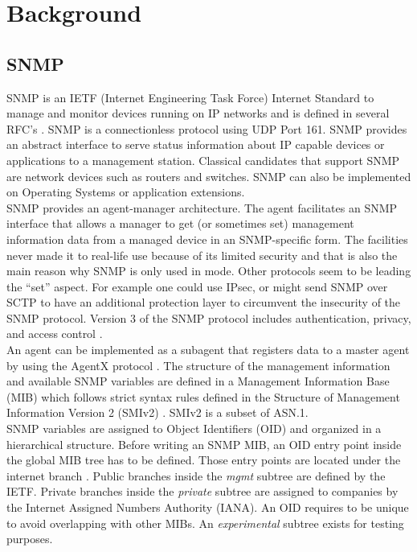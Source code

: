 \section{Background}
\label{chap:background}
\subsection{SNMP}
SNMP is an IETF (Internet Engineering Task Force) Internet Standard to manage and monitor devices running on IP networks and is defined in several RFC's \cite{snmp-rfc}. SNMP is a connectionless protocol using UDP Port 161. SNMP provides an abstract interface to serve status information about IP capable devices or applications to a management station. Classical candidates that support SNMP are network devices such as routers and switches. SNMP can also be implemented on Operating Systems or application extensions. 
\\
SNMP provides an agent-manager architecture. The agent facilitates an SNMP interface that allows a manager to get (or sometimes set) management information data from a managed device in an SNMP-specific form.
The  facilities never made it to real-life use because of its limited security and that is also the main reason why SNMP is only used in  mode. Other protocols seem to be leading the “set” aspect. For example one could use IPsec, or might send SNMP over SCTP to have an additional protection layer to circumvent the insecurity of the SNMP protocol. Version 3 of the SNMP protocol includes authentication, privacy, and access control \cite{cisco-snmp}. 
 \\
An agent can be implemented as a subagent that registers data to a master agent by using the AgentX protocol \cite{agentx}. The structure of the management information and available SNMP variables are defined in a Management Information Base (MIB) which follows strict syntax rules defined in the Structure of Management Information Version 2 (SMIv2) \cite{smiv2}. SMIv2 is a subset of ASN.1. 
\\
SNMP variables are assigned to Object Identifiers (OID) and organized in a hierarchical structure. Before writing an SNMP MIB, an OID entry point inside the global MIB tree has to be defined. Those entry points are located under the internet branch \cite{oid1}. Public branches  inside the \textit{mgmt} subtree are defined by the IETF. Private branches inside the \textit{private} subtree are assigned to companies by the Internet Assigned Numbers Authority (IANA). An OID requires to be unique to avoid overlapping with other MIBs. An \textit{experimental} subtree exists for testing purposes.


